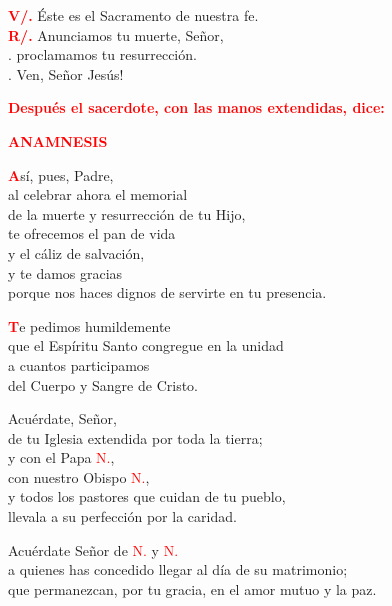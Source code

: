 \documentclass[12pt, letterpaper]{report}
\begin{document}
\Large \hspace{-0.9cm} {\bfseries \textcolor{red}{V/.}} \hspace{0.6cm} \'Este es el Sacramento de nuestra fe.\\
\Large \hspace{-0.9cm} {\bfseries \textcolor{red}{R/.}} \hspace{0.4cm} Anunciamos tu muerte, Se\~nor,\\
. \hspace{1.3cm} proclamamos tu resurrecci\'on.\\
. \hspace{1.3cm} Ven, Se\~nor Jes\'us!\newline

\large{\bfseries \textcolor{red}{Despu\'es el sacerdote, con las manos extendidas, dice:}}

\newpage

\Large {\bfseries \textcolor{red}{ANAMNESIS}}

\lettrine[lines=1]{\bfseries \textcolor{red}{A}}{}\Large s\'i, pues, Padre,\\
al celebrar ahora el memorial\\
de la muerte y resurrecci\'on de tu Hijo,\\
te ofrecemos el pan de vida \\
y el c\'aliz de salvaci\'on,\\
y te damos gracias\\
porque nos haces dignos de servirte en tu presencia.

\lettrine[lines=1]{\bfseries \textcolor{red}{T}}{}\Large e pedimos humildemente\\
que el Esp\'iritu Santo congregue en la unidad\\
a cuantos participamos\\
del Cuerpo y Sangre de Cristo.\newline

Acu\'erdate, Se\~nor,\\
de tu Iglesia extendida por toda la tierra; \\
y con el Papa \textcolor{red}{N.},\\
con nuestro Obispo \textcolor{red}{N.},\\
y todos los pastores que cuidan de tu pueblo,\\
llevala a su perfecci\'on por la caridad.\newline

Acu\'erdate Se\~nor de \textcolor{red}{N.} y \textcolor{red}{N.} \\
a quienes has concedido llegar al d\'ia de su matrimonio; \\
que permanezcan, por tu gracia, en el amor mutuo y la paz.
\end{document}
